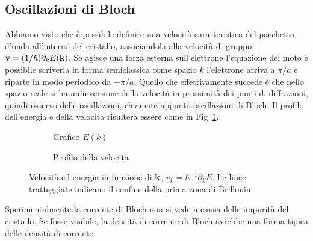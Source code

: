 \documentclass[a4paper,12pt]{article}
\begin{document}
\subsection{Oscillazioni di Bloch}



Abbiamo visto che è possibile definire una velocità caratteristica del pacchetto d'onda all'interno del cristallo, associandola alla velocità di gruppo ${\it\bf v} = (1/\hbar) \partial_kE({\it\bf k})$. Se agisce una forza esterna sull'elettrone l'equazione del moto è possibile scriverla in forma semiclassica come
spazio $k$ l'elettrone arriva a $\pi/a$ e riparte in modo periodico da $-\pi/a$. Quello che effettivamente succede è che nello spazio reale si ha un'inversione della velocità in prossimità dei punti di diffrazioni, quindi osservo delle oscillazioni, chiamate appunto oscillazioni di Bloch. Il profilo dell'energia e della velocità risulterà essere come in Fig~\ref{vel:en}.
\begin{figure}
	\centering
	\begin{subfigure}[b]{0.3\textwidth}
		\caption{Grafico $E(k)$}
	\end{subfigure}
	\qquad\quad
	\begin{subfigure}[b]{0.3\textwidth}
		\caption{Profilo della velocità}
	\end{subfigure}
	\caption{Velocità ed energia in funzione di  ${\it\bf k}$, $v_k = \hbar^{-1} \partial_k E$. Le linee tratteggiate indicano il confine della prima zona di Brillouin}
	\label{vel:en}
\end{figure}
Sperimentalmente la corrente di Bloch non si vede a causa delle impurità del cristallo. Se fosse visibile, la densità di corrente di Bloch avrebbe una forma tipica delle densità di corrente
\end{document}
